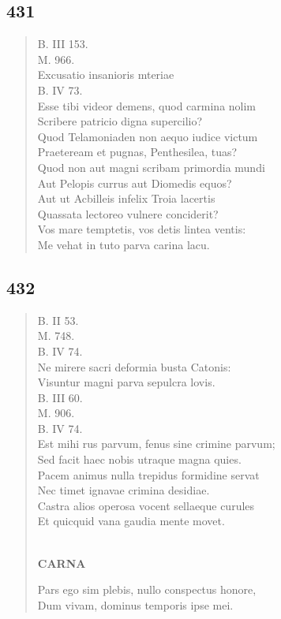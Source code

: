 \documentclass[11pt, a4paper]{report}
\begin{document}
            \subsection*{431}
      \begin{verse}
      B. III 153. \\ M. 966. \\ Excusatio insanioris mteriae \\ B. IV 73. \\ Esse tibi videor demens, quod carmina nolim \\ Scribere patricio digna supercilio? \\ Quod Telamoniaden non aequo iudice victum \\ Praeteream et pugnas, Penthesilea, tuas? \\ Quod non aut magni scribam primordia mundi \\ Aut Pelopis currus aut Diomedis equos? \\ Aut  \lbrack ut \rbrack  Acbilleis infelix Troia lacertis \\ Quassata lectoreo vulnere conciderit? \\ Vos mare temptetis, vos detis lintea ventis: \\ Me vehat in tuto parva carina lacu. \\ 
      \end{verse}
  
            \subsection*{432}
      \begin{verse}
      B. II 53. \\ M. 748. \\ B. IV 74. \\ Ne mirere sacri deformia busta Catonis: \\ Visuntur magni parva sepulcra lovis. \\ B. III 60. \\ M. 906. \\ B. IV 74. \\ Est mihi rus parvum, fenus sine crimine parvum; \\ Sed facit haec nobis utraque magna quies. \\ Pacem animus nulla trepidus formidine servat \\ Nec timet ignavae crimina desidiae. \\ Castra alios operosa vocent sellaeque curules \\ Et quicquid vana gaudia mente movet. \\ 
        ﻿\pagebreak 
     \marginpar{[330]} \begin{center} \textbf{CARNA} \end{center}Pars ego sim plebis, nullo conspectus honore, \\ Dum vivam, dominus temporis ipse mei. \\ 
      \end{verse}
  
\end{document}
